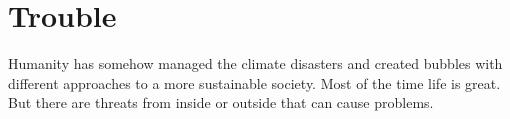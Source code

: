 \chapter{Trouble}

Humanity has somehow managed the climate disasters and created bubbles with different approaches to a more sustainable society. Most of the time life is great. But there are threats from inside or outside that can cause problems.






